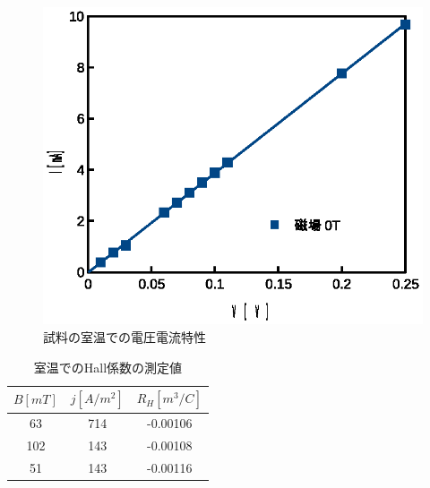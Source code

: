 \documentclass[11pt,a4]{jarticle}
\begin{document}
\begin{figure}[!htbp]
   \begin{center}
    \includegraphics[width=0.5\hsize]{./conductivity_RT.eps}
    \caption{試料の室温での電圧電流特性}
     \label{fig:conductivity_RT}
   \end{center}
\end{figure}

\begin{table}[!htbp]
   \begin{center}
  \begin{tabular}{ccc}
    $B [mT]$  & $j [A/m^2]$ & $R_H [m^3/C]$\\ \hline
    63 & 714 & -0.00106 \\
    102 & 143 & -0.00108 \\
    51 &143 & -0.00116 \\
  \end{tabular}
  \label{tab:Hall}
     \end{center}
       \caption{室温でのHall係数の測定値}
\end{table}
\end{document}
